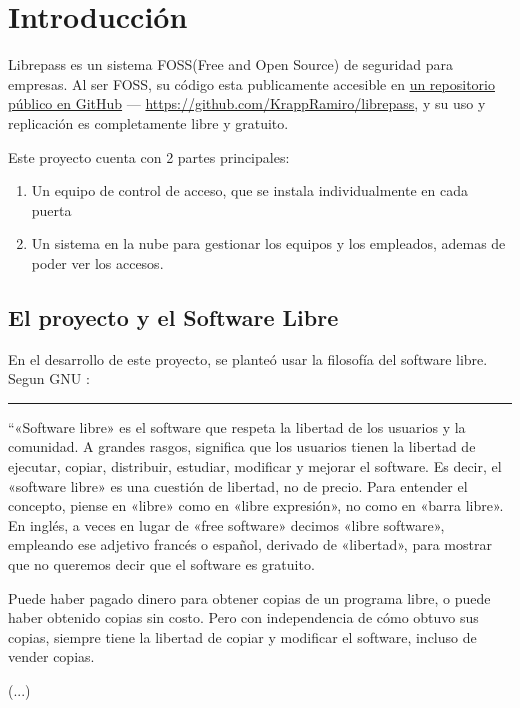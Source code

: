 \documentclass[../informe_krapp.tex]{subfiles}
\begin{document}
\graphicspath{{../images/}}
{
\renewcommand{\subsectionbreak}{}
\section{Introducción}

Librepass es un sistema FOSS(Free and Open Source) de seguridad para empresas.
Al ser FOSS, su código esta publicamente accesible en
\href{https://github.com/KrappRamiro/librepass}{un repositorio público en GitHub} ---
{\small \url{https://github.com/KrappRamiro/librepass}}, y su uso y replicación es completamente libre y gratuito.

Este proyecto cuenta con 2 partes principales:
\begin{enumerate}
	\item Un equipo de control de acceso, que se instala individualmente en cada puerta
	\item Un sistema en la nube para gestionar los equipos y los empleados, ademas de poder ver los accesos.
\end{enumerate}

\subsection{El proyecto y el Software Libre}
En el desarrollo de este proyecto, se planteó usar la filosofía del software libre.
Segun GNU \cite{gnu}:
\begin{center}
	\rule{0.8\textwidth}{0.3pt}
\end{center}
``«Software libre» es el software que respeta la libertad de los usuarios y la comunidad. A grandes rasgos, significa que los usuarios tienen la libertad de ejecutar, copiar, distribuir, estudiar, modificar y mejorar el software. Es decir, el «software libre» es una cuestión de libertad, no de precio. Para entender el concepto, piense en «libre» como en «libre expresión», no como en «barra libre». En inglés, a veces en lugar de «free software» decimos «libre software», empleando ese adjetivo francés o español, derivado de «libertad», para mostrar que no queremos decir que el software es gratuito.

Puede haber pagado dinero para obtener copias de un programa libre, o puede haber obtenido copias sin costo. Pero con independencia de cómo obtuvo sus copias, siempre tiene la libertad de copiar y modificar el software, incluso de vender copias.

(...)

}
\end{document}
